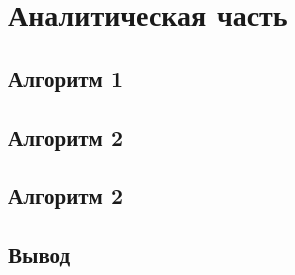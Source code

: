 \section{Аналитическая часть}

\subsection{Алгоритм 1}


\subsection{Алгоритм 2}

\subsection{Алгоритм 2}

\subsection*{Вывод}

